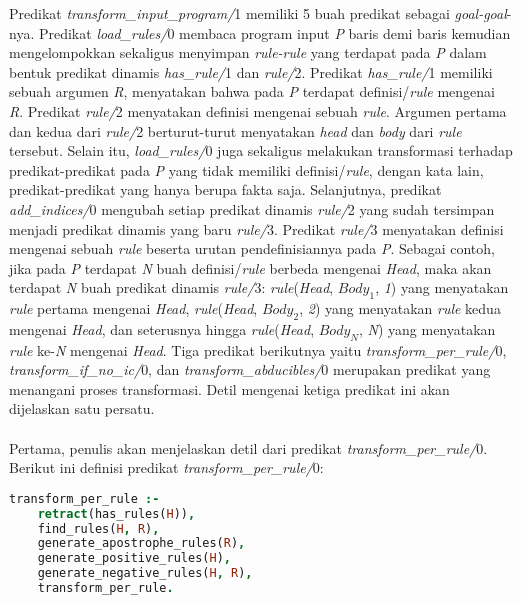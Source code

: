Predikat \textit{transform\_input\_program/}1 memiliki 5 buah predikat sebagai \textit{goal-goal}-nya. Predikat \textit{load\_rules/}0 membaca program input \textit{P} baris demi baris kemudian mengelompokkan sekaligus menyimpan \textit{rule-rule} yang terdapat pada \textit{P} dalam bentuk predikat dinamis \textit{has\_rule/}1 dan \textit{rule/}2. Predikat \textit{has\_rule/}1 memiliki sebuah argumen \textit{R}, menyatakan bahwa pada \textit{P} terdapat definisi/\textit{rule} mengenai \textit{R}. Predikat \textit{rule/}2 menyatakan definisi mengenai sebuah \textit{rule}. Argumen pertama dan kedua dari \textit{rule/}2 berturut-turut menyatakan \textit{head} dan \textit{body} dari \textit{rule} tersebut. Selain itu, \textit{load\_rules/}0 juga sekaligus melakukan transformasi terhadap predikat-predikat pada \textit{P} yang tidak memiliki definisi/\textit{rule}, dengan kata lain, predikat-predikat yang hanya berupa fakta saja. Selanjutnya, predikat \textit{add\_indices/}0 mengubah setiap predikat dinamis \textit{rule/}2 yang sudah tersimpan menjadi predikat dinamis yang baru \textit{rule/}3. Predikat \textit{rule/}3 menyatakan definisi mengenai sebuah \textit{rule} beserta urutan pendefinisiannya pada \textit{P}. Sebagai contoh, jika pada \textit{P} terdapat \textit{N} buah definisi/\textit{rule} berbeda mengenai \textit{Head}, maka akan terdapat \textit{N} buah predikat dinamis \textit{rule/}3: \textit{rule}(\textit{Head}, \textit{$Body_1$}, \textit{1}) yang menyatakan \textit{rule} pertama mengenai \textit{Head}, \textit{rule}(\textit{Head}, \textit{$Body_2$}, \textit{2}) yang menyatakan \textit{rule} kedua mengenai \textit{Head}, dan seterusnya hingga \textit{rule}(\textit{Head}, \textit{$Body_N$}, \textit{N}) yang menyatakan \textit{rule} ke-\textit{N} mengenai \textit{Head}. Tiga predikat berikutnya yaitu \textit{transform\_per\_rule/}0, \textit{transform\_if\_no\_ic/}0, dan \textit{transform\_abducibles/}0 merupakan predikat yang menangani proses transformasi. Detil mengenai ketiga predikat ini akan dijelaskan satu persatu.
\\ \\
Pertama, penulis akan menjelaskan detil dari predikat \textit{transform\_per\_rule/}0. Berikut ini definisi predikat \textit{transform\_per\_rule/}0: \\

\begin{lstlisting}[language=Prolog, caption=Definisi predikat \textit{transform\_per\_rule/}0,
tabsize=4,
frame=none,
captionpos=b]
transform_per_rule :-
	retract(has_rules(H)),
	find_rules(H, R),
	generate_apostrophe_rules(R),
	generate_positive_rules(H),
	generate_negative_rules(H, R),
	transform_per_rule.
\end{lstlisting}

